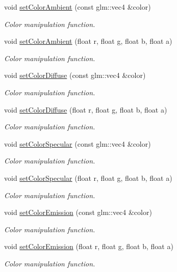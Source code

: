 \begin{DoxyCompactItemize}
\item 
void \mbox{\hyperlink{classec_1_1_material_afdd82441b5b2168161a17824e4a90f6f}{set\+Color\+Ambient}} (const glm\+::vec4 \&color)
\begin{DoxyCompactList}\small\item\em Color manipulation function. \end{DoxyCompactList}\item 
void \mbox{\hyperlink{classec_1_1_material_a4ee41422a7625ac8a9f8a5e52bb18cf7}{set\+Color\+Ambient}} (float r, float g, float b, float a)
\begin{DoxyCompactList}\small\item\em Color manipulation function. \end{DoxyCompactList}\item 
void \mbox{\hyperlink{classec_1_1_material_a22b711323a849e2ff6f9ffb871402a3e}{set\+Color\+Diffuse}} (const glm\+::vec4 \&color)
\begin{DoxyCompactList}\small\item\em Color manipulation function. \end{DoxyCompactList}\item 
void \mbox{\hyperlink{classec_1_1_material_aa86e76b930ffffd45076465eff08bf27}{set\+Color\+Diffuse}} (float r, float g, float b, float a)
\begin{DoxyCompactList}\small\item\em Color manipulation function. \end{DoxyCompactList}\item 
void \mbox{\hyperlink{classec_1_1_material_a947f0946ff806852e1733b1e95a03489}{set\+Color\+Specular}} (const glm\+::vec4 \&color)
\begin{DoxyCompactList}\small\item\em Color manipulation function. \end{DoxyCompactList}\item 
void \mbox{\hyperlink{classec_1_1_material_aa62e40f0571c25eb097f03c74849f918}{set\+Color\+Specular}} (float r, float g, float b, float a)
\begin{DoxyCompactList}\small\item\em Color manipulation function. \end{DoxyCompactList}\item 
void \mbox{\hyperlink{classec_1_1_material_a77ac7702af54e4c8a7301387bea159dd}{set\+Color\+Emission}} (const glm\+::vec4 \&color)
\begin{DoxyCompactList}\small\item\em Color manipulation function. \end{DoxyCompactList}\item 
void \mbox{\hyperlink{classec_1_1_material_a6fa0dfb1c76b2c9b07fbd2b28021010c}{set\+Color\+Emission}} (float r, float g, float b, float a)
\begin{DoxyCompactList}\small\item\em Color manipulation function. \end{DoxyCompactList}\end{DoxyCompactItemize}



